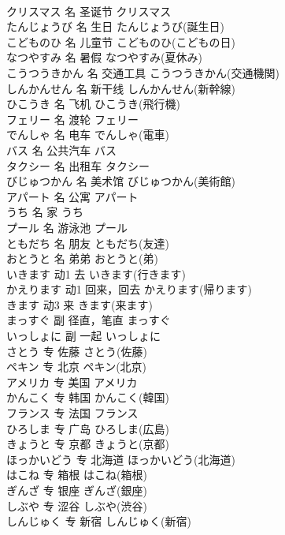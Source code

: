 \documentclass[8pt]{extreport}
\begin{document}
\begin{CJK}{UTF8}{min}
\\	クリスマス	名	圣诞节	クリスマス	
\\	たんじょうび	名	生日	たんじょうび(誕生日)	
\\	こどものひ	名	儿童节	こどものひ(こどもの日)	
\\	なつやすみ	名	暑假	なつやすみ(夏休み)	
\\	こうつうきかん	名	交通工具	こうつうきかん(交通機関)	
\\	しんかんせん	名	新干线	しんかんせん(新幹線)	
\\	ひこうき	名	飞机	ひこうき(飛行機)	
\\	フェリー	名	渡轮	フェリー	
\\	でんしゃ	名	电车	でんしゃ(電車)	
\\	バス	名	公共汽车	バス	
\\	タクシー	名	出租车	タクシー	
\\	びじゅつかん	名	美术馆	びじゅつかん(美術館)	
\\	アパート	名	公寓	アパート	
\\	うち	名	家	うち	
\\	プール	名	游泳池	プール	
\\	ともだち	名	朋友	ともだち(友達)	
\\	おとうと	名	弟弟	おとうと(弟)	
\\	いきます	动1	去	いきます(行きます)	
\\	かえります	动1	回来，回去	かえります(帰ります)	
\\	きます	动3	来	きます(来ます)	
\\	まっすぐ	副	径直，笔直	まっすぐ	
\\	いっしょに	副	一起	いっしょに	
\\	さとう	专	佐藤	さとう(佐藤)	
\\	ペキン	专	北京	ペキン(北京)	
\\	アメリカ	专	美国	アメリカ	
\\	かんこく	专	韩国	かんこく(韓国)	
\\	フランス	专	法国	フランス	
\\	ひろしま	专	广岛	ひろしま(広島)	
\\	きょうと	专	京都	きょうと(京都)	
\\	ほっかいどう	专	北海道	ほっかいどう(北海道)	
\\	はこね	专	箱根	はこね(箱根)	
\\	ぎんざ	专	银座	ぎんざ(銀座)	
\\	しぶや	专	涩谷	しぶや(渋谷)	
\\	しんじゅく	专	新宿	しんじゅく(新宿)	

\end{CJK}
\end{document}
